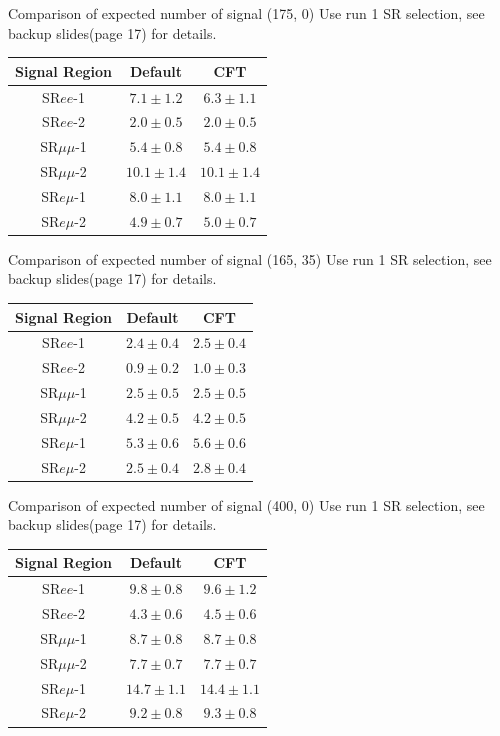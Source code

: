 \documentclass[mathserif,serif]{beamer}
\begin{document}
\begin{frame}{Comparison of expected number of signal (175, 0)}
Use run 1 SR selection, see backup slides(page 17) for details.
\begin{tabular}{|c|c|c|}
\hline
Signal Region & Default & CFT \\
\hline
SR$ee$-1     & $7.1\pm1.2$ & $6.3\pm1.1$ \\
\hline
SR$ee$-2     & $2.0\pm0.5$ & $2.0\pm0.5$ \\
\hline
SR$\mu\mu$-1 & $5.4\pm0.8$ & $5.4\pm0.8$ \\
\hline
SR$\mu\mu$-2 & $10.1\pm1.4$ & $10.1\pm1.4$ \\
\hline
SR$e\mu$-1   & $8.0\pm1.1$ & $8.0\pm1.1$ \\
\hline
SR$e\mu$-2   & $4.9\pm0.7$ & $5.0\pm0.7$ \\
\hline
\end{tabular}
\end{frame}

\begin{frame}{Comparison of expected number of signal (165, 35)}
Use run 1 SR selection, see backup slides(page 17) for details.
\begin{tabular}{|c|c|c|}
\hline
Signal Region & Default & CFT \\
\hline
SR$ee$-1     & $2.4\pm0.4$ & $2.5\pm0.4$ \\
\hline
SR$ee$-2     & $0.9\pm0.2$ & $1.0\pm0.3$ \\
\hline
SR$\mu\mu$-1 & $2.5\pm0.5$ & $2.5\pm0.5$ \\
\hline
SR$\mu\mu$-2 & $4.2\pm0.5$ & $4.2\pm0.5$ \\
\hline
SR$e\mu$-1   & $5.3\pm0.6$ & $5.6\pm0.6$ \\
\hline
SR$e\mu$-2   & $2.5\pm0.4$ & $2.8\pm0.4$ \\
\hline
\end{tabular}
\end{frame}

\begin{frame}{Comparison of expected number of signal (400, 0)}
Use run 1 SR selection, see backup slides(page 17) for details.
\begin{tabular}{|c|c|c|}
\hline
Signal Region & Default & CFT \\
\hline
SR$ee$-1     & $9.8\pm0.8$ & $9.6\pm1.2$ \\
\hline
SR$ee$-2     & $4.3\pm0.6$ & $4.5\pm0.6$ \\
\hline
SR$\mu\mu$-1 & $8.7\pm0.8$ & $8.7\pm0.8$ \\
\hline
SR$\mu\mu$-2 & $7.7\pm0.7$ & $7.7\pm0.7$ \\
\hline
SR$e\mu$-1   & $14.7\pm1.1$ & $14.4\pm1.1$ \\
\hline
SR$e\mu$-2   & $9.2\pm0.8$ & $9.3\pm0.8$ \\
\hline
\end{tabular}
\end{frame}
\end{document}
